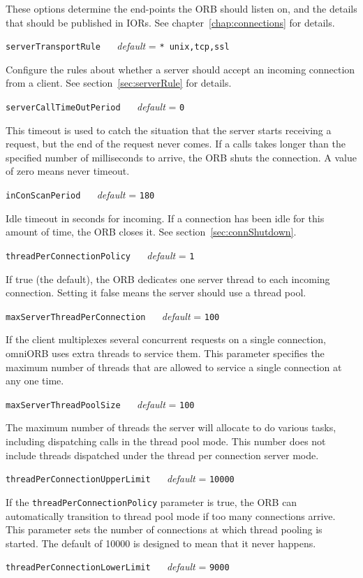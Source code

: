 \documentclass[draft,11pt,twoside,a4paper]{book}
\makeatletter
\newcommand{\code}[1]{\texttt{#1}}
\newcommand{\confopt}[2]
  {\vspace{\baselineskip}\par\noindent\code{#1} ~~ \textit{default} =
   \code{#2}\\[-1ex]\@afterheading}
\makeatother
\begin{document}
\noindent
These options determine the end-points the ORB should listen on, and
the details that should be published in IORs. See
chapter~\ref{chap:connections} for details.



\confopt{serverTransportRule}{* unix,tcp,ssl}

Configure the rules about whether a server should accept an incoming
connection from a client. See section~\ref{sec:serverRule} for
details.


\confopt{serverCallTimeOutPeriod}{0}

This timeout is used to catch the situation that the server starts
receiving a request, but the end of the request never comes. If a
calls takes longer than the specified number of milliseconds to
arrive, the ORB shuts the connection. A value of zero means never
timeout.


\confopt{inConScanPeriod}{180}

Idle timeout in seconds for incoming. If a connection has been idle
for this amount of time, the ORB closes it. See
section~\ref{sec:connShutdown}.


\confopt{threadPerConnectionPolicy}{1}

If true (the default), the ORB dedicates one server thread to each
incoming connection. Setting it false means the server should use a
thread pool.


\confopt{maxServerThreadPerConnection}{100}

If the client multiplexes several concurrent requests on a single
connection, omniORB uses extra threads to service them. This parameter
specifies the maximum number of threads that are allowed to service a
single connection at any one time.


\confopt{maxServerThreadPoolSize}{100}

The maximum number of threads the server will allocate to do various
tasks, including dispatching calls in the thread pool mode. This
number does not include threads dispatched under the thread per
connection server mode.


\confopt{threadPerConnectionUpperLimit}{10000}

If the \code{threadPerConnectionPolicy} parameter is true, the ORB can
automatically transition to thread pool mode if too many connections
arrive. This parameter sets the number of connections at which thread
pooling is started. The default of 10000 is designed to mean that it
never happens.


\confopt{threadPerConnectionLowerLimit}{9000}
\end{document}
